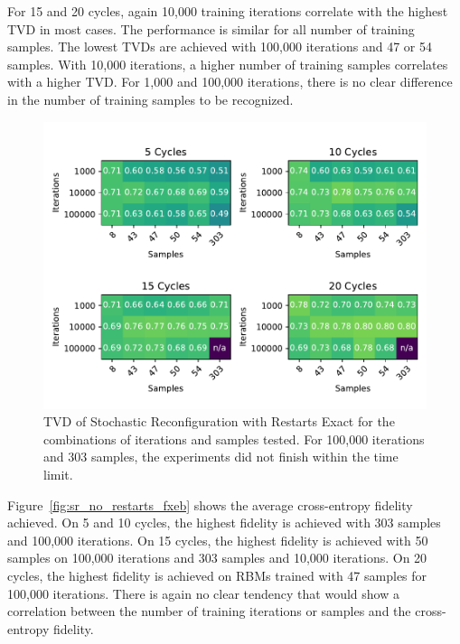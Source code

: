 For 15 and 20 cycles, again 10,000 training iterations correlate with the highest TVD in most cases.
The performance is similar for all number of training samples. The lowest TVDs are achieved with 100,000
iterations and 47 or 54 samples. With 10,000 iterations, a higher number of training samples correlates 
with a higher TVD. For 1,000 and 100,000 iterations, there is no clear difference in the number of training 
samples to be recognized.

\begin{figure}[H]
  \centering
  \includegraphics[width=\textwidth]{figures/results/SR-restarts-not-learned/tvd_heatmap.pdf}
  \caption[TVD of Stochastic Reconfiguration with Restarts Exact]{TVD of Stochastic 
  Reconfiguration with Restarts Exact for the combinations of iterations and samples tested.
  For 100,000 iterations and 303 samples, the experiments did not finish within the time limit.}
  \label{fig:sr_exact_tvd}
\end{figure}

Figure~\ref{fig:sr_no_restarts_fxeb} shows the average cross-entropy fidelity achieved. On 5 and 10
cycles, the highest fidelity is achieved with 303 samples and 100,000 iterations. 
On 15 cycles, the highest fidelity is achieved with 50 samples on 100,000 iterations and 
303 samples and 10,000 iterations.
On 20 cycles, the highest fidelity is achieved on RBMs trained with 47 samples for 100,000 iterations.
There is again no clear tendency that would show a correlation between 
the number of training iterations or samples and the cross-entropy fidelity.

